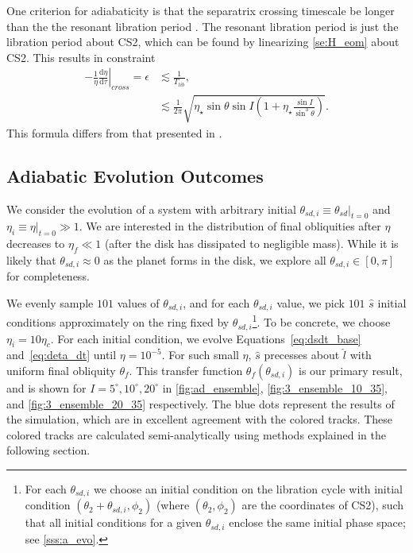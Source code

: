 \documentclass[
        fleqn,
        usenatbib,
    ]{mnras}
\newcommand*{\rd}[2]{\frac{\mathrm{d}#1}{\mathrm{d}#2}}
\newcommand*{\at}[1]{\left.#1\right|}
\newcommand*{\p}[1]{\left(#1\right)}
\begin{document}
One criterion for adiabaticity is that the separatrix crossing timescale be
longer than the the resonant libration period \citep{ward2004I}. The resonant
libration period is just the libration period about CS2, which can be found by
linearizing \autoref{se:H_eom} about CS2. This results in constraint
\begin{align}
    -\at{\frac{1}{\eta}\rd{\eta}{\tau}}_{cross} = \epsilon &\lesssim
            \frac{1}{T_{lib}},\nonumber\\
        &\lesssim \frac{1}{2\pi}\sqrt{\eta_\star\sin\theta \sin I
            \p{1 + \eta_\star \frac{\sin I}{\sin^3\theta}}}.\label{eq:ad_constr}
\end{align}
This formula differs from that presented in \citealt{millholland_disk}.

\subsection{Adiabatic Evolution Outcomes}\label{ss:ad_ensemble}

We consider the evolution of a system with arbitrary initial $\theta_{sd, i}
\equiv \at{\theta_{sd}}_{t = 0}$ and $\eta_i \equiv \at{\eta}_{t = 0} \gg 1$. We
are interested in the distribution of final obliquities after $\eta$ decreases
to $\eta_f \ll 1$ (after the disk has dissipated to negligible mass). While it
is likely that $\theta_{sd, i} \approx 0$ as the planet forms in the disk, we
explore all $\theta_{sd, i} \in [0, \pi]$ for completeness.

We evenly sample $101$ values of $\theta_{sd, i}$, and for each $\theta_{sd, i}$
value, we pick $101$ $\hat{s}$ initial conditions approximately on the ring
fixed by $\theta_{sd, i}$\footnote{For each $\theta_{sd, i}$ we choose an
initial condition on the libration cycle with initial condition $\p{\theta_2 +
\theta_{sd, i}, \phi_2}$ (where $\p{\theta_2, \phi_2}$ are the coordinates of
CS2), such that all initial conditions for a given $\theta_{sd, i}$ enclose the
same initial phase space; see \autoref{sss:a_evo}.}. To be concrete, we choose
$\eta_i = 10\eta_c$. For each initial condition, we evolve
Equations~\ref{eq:dsdt_base} and~\ref{eq:deta_dt} until $\eta = 10^{-5}$. For
such small $\eta$, $\hat{s}$ precesses about $\hat{l}$ with uniform final
obliquity $\theta_f$. This transfer function $\theta_f\p{\theta_{sd, i}}$ is our
primary result, and is shown for $I = 5^\circ, 10^\circ, 20^\circ$ in
\autoref{fig:ad_ensemble}, \autoref{fig:3_ensemble_10_35}, and
\autoref{fig:3_ensemble_20_35} respectively. The blue dots represent the results
of the simulation, which are in excellent agreement with the colored tracks.
These colored tracks are calculated semi-analytically using methods explained in
the following section.
\end{document}
